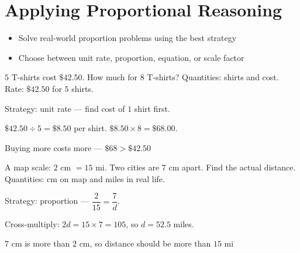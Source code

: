\section{Applying Proportional Reasoning}

\begin{stepGoal}
\begin{itemize}
    \item Solve real-world proportion problems using the best strategy
    \item Choose between unit rate, proportion, equation, or scale factor
\end{itemize}
\end{stepGoal}

\begin{stepVocabBox}
\end{stepVocabBox}

\begin{stepsCard}
\end{stepsCard}

\begin{stepExample}{$5$ T-shirts cost $\$42.50$. How much for $8$ T-shirts?}
     Quantities: shirts and cost. Rate: $\$42.50$ for $5$ shirts.

     Strategy: unit rate — find cost of $1$ shirt first.

     $\$42.50 \div 5 = \$8.50$ per shirt. \; $\$8.50 \times 8 = \$68.00$.

     Buying more costs more — $\$68 > \$42.50$ \checkmark
\end{stepExample}

\begin{stepExample}{A map scale: $2$ cm $= 15$ mi. Two cities are $7$ cm apart. Find the actual distance.}
     Quantities: cm on map and miles in real life.

     Strategy: proportion — $\dfrac{2}{15} = \dfrac{7}{d}$.

     Cross-multiply: $2d = 15 \times 7 = 105$, so $d = 52.5$ miles.

     $7$ cm is more than $2$ cm, so distance should be more than $15$ mi \checkmark
\end{stepExample}


